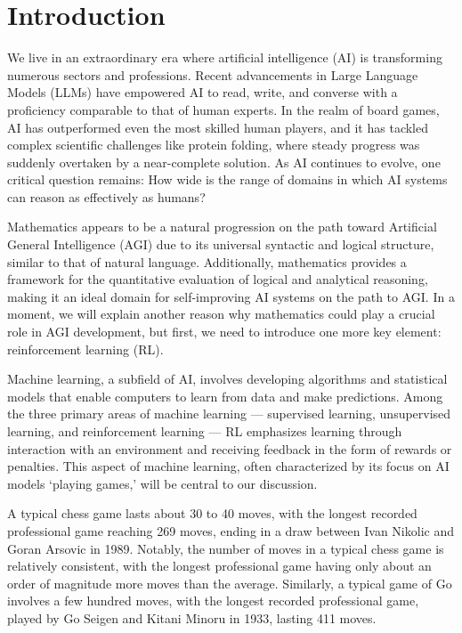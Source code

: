 
\section{Introduction\label{sec:intro}}

We live in an extraordinary era where artificial intelligence (AI) is transforming numerous sectors and professions. Recent advancements in Large Language Models (LLMs) have empowered AI to read, write, and converse with a proficiency comparable to that of human experts. In the realm of board games, AI has outperformed even the most skilled human players, and it has tackled complex scientific challenges like protein folding, where steady progress was suddenly overtaken by a near-complete solution. As AI continues to evolve, one critical question remains: How wide is the range of domains in which AI systems can reason as effectively as humans?

Mathematics appears to be a natural progression on the path toward Artificial General Intelligence (AGI) due to its universal syntactic and logical structure, similar to that of natural language. Additionally, mathematics provides a framework for the quantitative evaluation of logical and analytical reasoning, making it an ideal domain for self-improving AI systems on the path to AGI. In a moment, we will explain another reason why mathematics could play a crucial role in AGI development, but first, we need to introduce one more key element: reinforcement learning (RL).

Machine learning, a subfield of AI, involves developing algorithms and statistical models that enable computers to learn from data and make predictions. Among the three primary areas of machine learning --- supervised learning, unsupervised learning, and reinforcement learning --- RL emphasizes learning through interaction with an environment and receiving feedback in the form of rewards or penalties. This aspect of machine learning, often characterized by its focus on AI models `playing games,’ will be central to our discussion.

A typical chess game lasts about 30 to 40 moves, with the longest recorded professional game reaching 269 moves, ending in a draw between Ivan Nikolic and Goran Arsovic in 1989. Notably, the number of moves in a typical chess game is relatively consistent, with the longest professional game having only about an order of magnitude more moves than the average. Similarly, a typical game of Go involves a few hundred moves, with the longest recorded professional game, played by Go Seigen and Kitani Minoru in 1933, lasting 411 moves.

